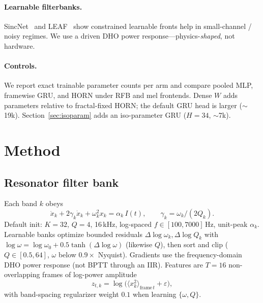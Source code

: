 \documentclass[11pt,a4paper]{article}
\begin{document}
\paragraph{Learnable filterbanks.}
SincNet~\citep{ravanelli2018sincnet} and LEAF~\citep{zeghidour2021leaf} show
constrained learnable fronts help in small-channel / noisy regimes. We use a
driven DHO power response---physics-\emph{shaped}, not hardware.

\paragraph{Controls.}
We report exact trainable parameter counts per arm and compare pooled MLP,
framewise GRU, and HORN under RFB and mel frontends. Dense $W$ adds parameters
relative to fractal-fixed HORN; the default GRU head is larger ($\sim$19k).
Section~\ref{sec:isoparam} adds an iso-parameter GRU ($H{=}34$, $\sim$7k).

\section{Method}
\label{sec:method}

\subsection{Resonator filter bank}
Each band $k$ obeys
\begin{equation}
  \ddot x_k + 2\gamma_k \dot x_k + \omega_k^2 x_k = \alpha_k\, I(t),
  \qquad \gamma_k=\omega_k/(2Q_k).
\end{equation}
Default init: $K{=}32$, $Q{=}4$, 16\,kHz, log-spaced
$f\in[100,7000]$\,Hz, unit-peak $\alpha_k$. Learnable banks optimize bounded
residuals
$\Delta\log\omega_k,\Delta\log Q_k$ with
$\log\omega=\log\omega_0+0.5\tanh(\Delta\log\omega)$ (likewise $Q$), then
sort and clip ($Q\in[0.5,64]$, $\omega$ below $0.9\times$ Nyquist). Gradients
use the frequency-domain DHO power response (not BPTT through an IIR). Features
are $T{=}16$ non-overlapping frames of log-power amplitude
\begin{equation}
  z_{t,k}=\log\!\big(\langle x_k^2\rangle_{\mathrm{frame}\,t}+\varepsilon\big),
\end{equation}
with band-spacing regularizer weight $0.1$ when learning $\{\omega,Q\}$.
\end{document}
